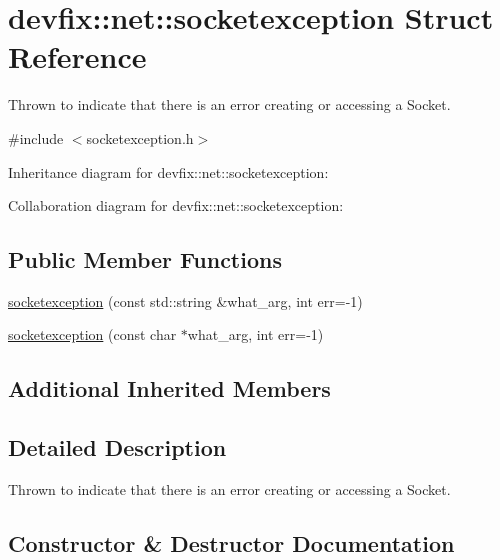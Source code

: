 \hypertarget{structdevfix_1_1net_1_1socketexception}{}\section{devfix\+:\+:net\+:\+:socketexception Struct Reference}
\label{structdevfix_1_1net_1_1socketexception}


Thrown to indicate that there is an error creating or accessing a Socket.  




{\ttfamily \#include $<$socketexception.\+h$>$}



Inheritance diagram for devfix\+:\+:net\+:\+:socketexception\+:


Collaboration diagram for devfix\+:\+:net\+:\+:socketexception\+:
\subsection*{Public Member Functions}
\begin{DoxyCompactItemize}
\item 
\hyperlink{structdevfix_1_1net_1_1socketexception_aeab5d004d494103b37156a5f23a5296a}{socketexception} (const std\+::string \&what\+\_\+arg, int err=-\/1)
\item 
\hyperlink{structdevfix_1_1net_1_1socketexception_a6da69f635eb11f932a0e960545d023bd}{socketexception} (const char $\ast$what\+\_\+arg, int err=-\/1)
\end{DoxyCompactItemize}
\subsection*{Additional Inherited Members}


\subsection{Detailed Description}
Thrown to indicate that there is an error creating or accessing a Socket. 

\subsection{Constructor \& Destructor Documentation}
\mbox{\label{structdevfix_1_1net_1_1socketexception_aeab5d004d494103b37156a5f23a5296a}} 

